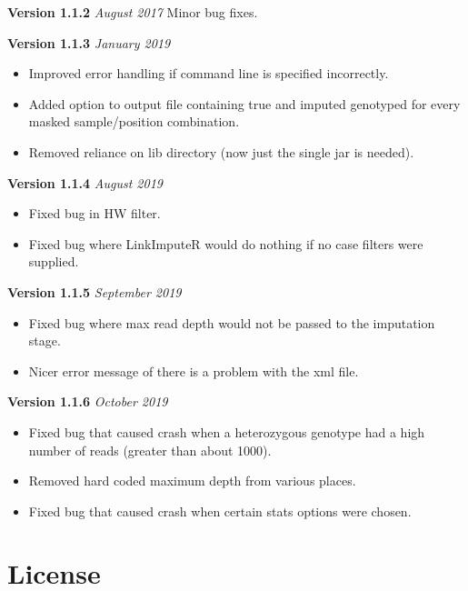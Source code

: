 \documentclass[10pt]{report}
\begin{document}
\textbf{Version 1.1.2} \textit{August 2017} Minor bug fixes.

\textbf{Version 1.1.3} \textit{January 2019}
\begin{itemize}
    \item Improved error handling if command line is specified incorrectly.
    \item Added option to output file containing true and imputed genotyped for every masked sample/position combination.
    \item Removed reliance on lib directory (now just the single jar is needed).
\end{itemize}

\textbf{Version 1.1.4} \textit{August 2019}
\begin{itemize}
    \item Fixed bug in HW filter.
    \item Fixed bug where LinkImputeR would do nothing if no case filters were supplied.
\end{itemize}

\textbf{Version 1.1.5} \textit{September 2019}
\begin{itemize}
    \item Fixed bug where max read depth would not be passed to the imputation stage.
    \item Nicer error message of there is a problem with the xml file.
\end{itemize}

\textbf{Version 1.1.6} \textit{October 2019}
\begin{itemize}
    \item Fixed bug that caused crash when a heterozygous genotype had a high number of reads (greater than about 1000).
    \item Removed hard coded maximum depth from various places.
    \item Fixed bug that caused crash when certain stats options were chosen.
\end{itemize}



\section{License}
\end{document}
